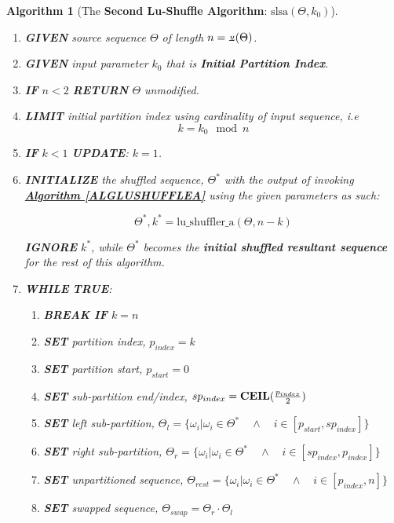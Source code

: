 \documentclass[a4paper, 18pt]{book} %
\newtheorem{alg}{Algorithm}
\newcommand{\invpi}{\rotatebox[origin=c]{180}{$\pi$}}
\begin{document}
\begin{alg}[The \textbf{Second Lu-Shuffle Algorithm}: $\text{slsa}(\Theta, k_0)$]
\label{ALGLUSHUFFLEB}
$ $\\
\begin{enumerate}
\item \textbf{GIVEN} source sequence $\Theta$ of length $n = \invpi(\Theta)$.
\item  \textbf{GIVEN} input parameter $k_0$ that is \textbf{Initial Partition Index}.
\item \textbf{IF} $n < 2$ \textbf{RETURN} $\Theta$ unmodified.
\item {\textbf{LIMIT} initial partition index using cardinality of input sequence, i.e
\begin{equation}
k = k_0 \mod n
\end{equation}
}
\item \textbf{IF} $k < 1$ \textbf{UPDATE}: $k = 1$.
\item{  \textbf{INITIALIZE} the shuffled sequence, $\Theta^*$ with the output of invoking \textbf{\hyperref[ALGLUSHUFFLEA]{Algorithm \ref{ALGLUSHUFFLEA}}} using the given parameters as such:

		\begin{equation}
		\label{EQIPI}
		\Theta^*,k^* = \text{lu\_shuffler\_a}(\Theta, n - k)
		\end{equation}
		
		\textbf{IGNORE} $k^*$, while $\Theta^*$ becomes the \textbf{initial shuffled resultant sequence} for the rest of this algorithm.
}
\item { \textbf{WHILE} \textbf{TRUE}:
\begin{enumerate}
	\item \textbf{BREAK IF} $k = n$
	\item \textbf{SET} partition index, $p_{index} = k$
	\item \textbf{SET} partition start, $p_{start} = 0$
	\item \textbf{SET} sub-partition end/index, $sp_{index} = \text{\textbf{CEIL}}(\frac{p_{index}}{2})$
	\item \textbf{SET} left sub-partition, $\Theta_{l} = \{\omega_i | \omega_i \in \Theta^* \quad \land \quad i \in [p_{start},sp_{index}]\}$
	\item \textbf{SET} right sub-partition, $\Theta_{r} = \{\omega_i | \omega_i \in \Theta^* \quad \land \quad i \in [sp_{index},p_{index}]\}$
	\item \textbf{SET} unpartitioned sequence, $\Theta_{rest} = \{\omega_i | \omega_i \in \Theta^* \quad \land \quad i \in [p_{index},n]\}$
	\item \textbf{SET} swapped sequence, $\Theta_{swap} = \Theta_{r} \cdot \Theta_{l}$ 
	

\end{enumerate}}
\end{enumerate}
\end{alg}
\end{document}

